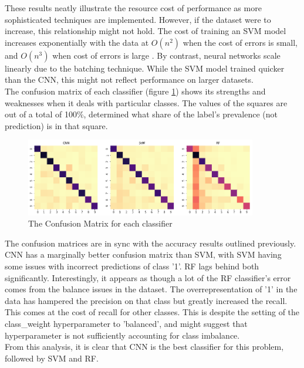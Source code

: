 \documentclass[12pt]{article}
\begin{document}
These results neatly illustrate the resource cost of performance as more sophisticated techniques are implemented. However, if the dataset were to increase, this relationship might not hold. The cost of training an SVM model increases exponentially with the data at $O(n^2)$ when the cost of errors is small, and $O(n^3)$ when cost of errors is large \citep{algoperformance}. By contrast, neural networks scale linearly due to the batching technique. While the SVM model trained quicker than the CNN, this might not reflect performance on larger datasets.\\

The confusion matrix of each classifier (figure \ref{img:cmset}) shows its strengths and weaknesses when it deals with particular classes. The values of the squares are out of a total of 100\%, determined what share of the label's prevalence (not prediction) is in that square.\\
\begin{figure}[h]
  \caption{The Confusion Matrix for each classifier}
  \label{img:cmset}
\centering
\includegraphics[width=0.9\textwidth]{images/cm_all.png}
\end{figure}

The confusion matrices are in sync with the accuracy results outlined previously. CNN has a marginally better confusion matrix than SVM, with SVM having some issues with incorrect predictions of class '1'. RF lags behind both significantly. Interestingly, it appears as though a lot of the RF classifier's error comes from the balance issues in the dataset. The overrepresentation of '1' in the data has hampered the precision on that class but greatly increased the recall. This comes at the cost of recall for other classes. This is despite the setting of the class\_weight hyperparameter to 'balanced', and might suggest that hyperparameter is not sufficiently accounting for class imbalance.\\

From this analysis, it is clear that CNN is the best classifier for this problem, followed by SVM and RF.\\
\end{document}
